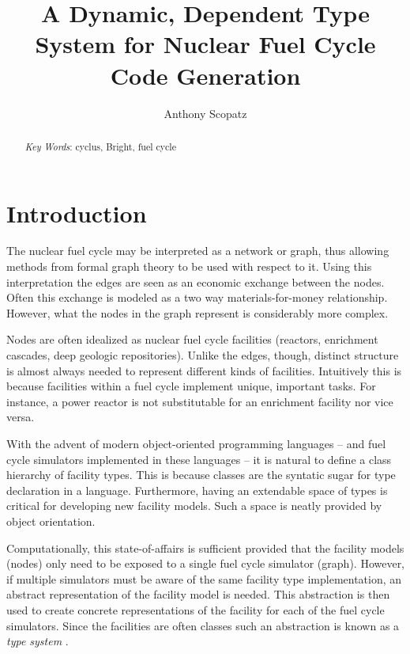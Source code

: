 \documentclass{ansconfpaper}
\begin{document}
\lstset{language=Python}

\title{A Dynamic, Dependent Type System for Nuclear Fuel Cycle Code Generation}

\author{Anthony Scopatz}

\maketitle

\begin{abstract}

\emph{Key Words}: cyclus, Bright, fuel cycle
\end{abstract}


\section{Introduction}
\label{sec:intro}
The nuclear fuel cycle may be interpreted as a network or graph, thus 
allowing methods from formal graph theory \cite{DIE05B} to be used with 
respect to it.  Using this interpretation the edges are seen as an economic exchange 
between the nodes.  Often this exchange is modeled as a two way materials-for-money 
relationship.  However, what the nodes in the graph represent is considerably 
more complex.  

Nodes are often idealized as nuclear fuel cycle facilities (reactors, enrichment
cascades, deep geologic repositories).  Unlike the edges, though, distinct structure
is almost always needed to represent different kinds of facilities.  Intuitively 
this is because facilities within a fuel cycle implement unique, important 
tasks.  For instance, a power reactor is not substitutable for an enrichment facility
nor vice versa.  

With the advent of modern object-oriented programming languages -- and fuel cycle
simulators implemented in these languages -- it is natural to define a class 
hierarchy of facility types.  This is because classes are the syntatic sugar for type 
declaration in a language.  Furthermore, having an extendable space of types is 
critical for developing new facility models.  Such a space is neatly provided by 
object orientation.

Computationally, this state-of-affairs is sufficient provided that the facility 
models (nodes) only need to be exposed to a single fuel cycle simulator (graph).
However, if multiple simulators must be aware of the same facility type 
implementation, an  abstract representation of the facility model is needed.  
This abstraction is then
used to create concrete representations of the facility for each of the fuel cycle
simulators.  Since the facilities are often classes such an abstraction is 
known as a \emph{type system} \cite{Pierce:2002:TPL:509043}.
\end{document}

